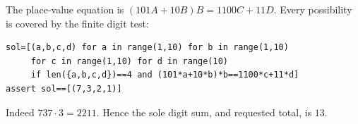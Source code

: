 The place-value equation is $(101A+10B)B=1100C+11D $. Every possibility is covered by the finite digit test:
\begin{verbatim}
sol=[(a,b,c,d) for a in range(1,10) for b in range(1,10)
     for c in range(1,10) for d in range(10)
     if len({a,b,c,d})==4 and (101*a+10*b)*b==1100*c+11*d]
assert sol==[(7,3,2,1)]
\end{verbatim}
Indeed $ 737\cdot3=2211 $. Hence the sole digit sum, and requested total, is $\boxed{13}$.
